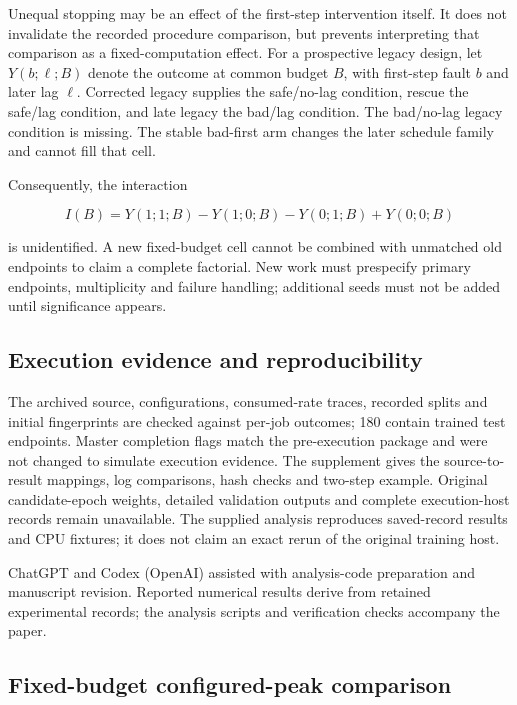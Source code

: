 \documentclass[referee,pdflatex,sn-mathphys-num]{sn-jnl}
\begin{document}
Unequal stopping may be an effect of the first-step intervention itself. It does not invalidate the recorded procedure comparison, but prevents interpreting that comparison as a fixed-computation effect. For a prospective legacy design, let \(Y(b;\ell;B)\) denote the outcome at common budget \(B\), with first-step fault \(b\) and later lag \(\ell\). Corrected legacy supplies the safe/no-lag condition, rescue the safe/lag condition, and late legacy the bad/lag condition. The bad/no-lag legacy condition is missing. The stable bad-first arm changes the later schedule family and cannot fill that cell.

Consequently, the interaction

\[I(B)=Y(1;1;B)-Y(1;0;B)-Y(0;1;B)+Y(0;0;B)\]

is unidentified. A new fixed-budget cell cannot be combined with unmatched old endpoints to claim a complete factorial. New work must prespecify primary endpoints, multiplicity and failure handling; additional seeds must not be added until significance appears.

\subsection{Execution evidence and reproducibility}\label{execution-evidence-and-reproducibility}

The archived source, configurations, consumed-rate traces, recorded splits and initial fingerprints are checked against per-job outcomes; 180 contain trained test endpoints. Master completion flags match the pre-execution package and were not changed to simulate execution evidence. The supplement gives the source-to-result mappings, log comparisons, hash checks and two-step example. Original candidate-epoch weights, detailed validation outputs and complete execution-host records remain unavailable. The supplied analysis reproduces saved-record results and CPU fixtures; it does not claim an exact rerun of the original training host.

ChatGPT and Codex (OpenAI) assisted with analysis-code preparation and manuscript revision. Reported numerical results derive from retained experimental records; the analysis scripts and verification checks accompany the paper.

\subsection{Fixed-budget configured-peak comparison}\label{fixed-budget-configured-peak-comparison}
\end{document}
